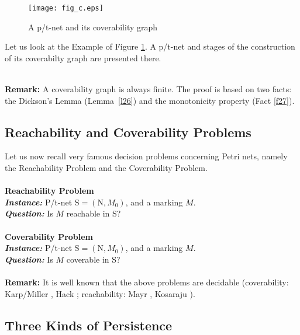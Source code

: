 \documentclass[a4paper]{llncs}
\begin{document}
\begin{example}
\begin{figure}[h]
\centering
\texttt{[image: fig\_c.eps]}
\caption{A p/t-net and its coverability graph}
\label{FigC}
\end{figure}
\label{e_cov}
Let us look at the Example of Figure \ref{FigC}. A p/t-net and stages of the construction of its coverabilty graph are presented there.
\end{example}
\mbox{ }\\
\textbf{Remark:} A coverability graph is always finite. The proof is based on two facts: the Dickson's Lemma (Lemma~\ref{l26}) and the monotonicity property (Fact \ref{f27}).
\\ 
\subsection{Reachability and Coverability Problems}


Let us now recall very famous decision problems concerning Petri nets, namely the Reachability Problem and the Coverability Problem.
\\ \\
\textbf{Reachability Problem}
\\
\indent\textbf{\emph{Instance:}} P/t-net $\mathrm{S}=(\mathrm{N}, M_0)$, and a marking $M$.\\
\indent\textbf{\emph{Question:}} Is $M$ reachable in S?
\\ \\
\textbf{Coverability Problem}
\\
\indent\textbf{\emph{Instance:}} P/t-net $\mathrm{S}=(\mathrm{N}, M_0)$, and a marking $M$.\\
\indent\textbf{\emph{Question:}} Is $M$ coverable in S?
\\ \\
\textbf{Remark:} It is well known that the above problems are decidable (coverability: Karp/Miller \cite{KarpMiller}, Hack \cite{Hack}; reachability: Mayr \cite{Mayr}, Kosaraju \cite{Kosaraju}). 


\subsection{Three Kinds of Persistence}
\end{document}
